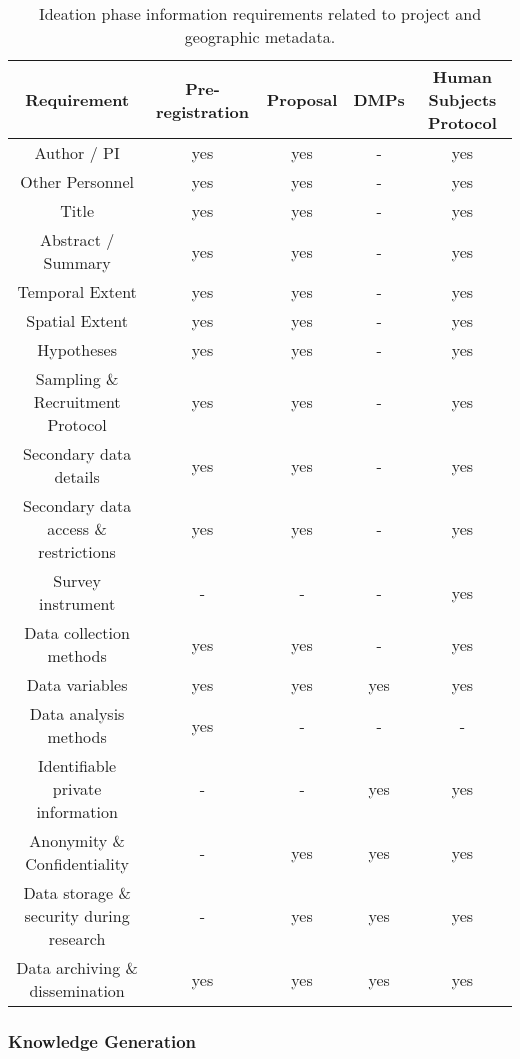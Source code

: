 \documentclass{isprs} %
\begin{document}
\begin{table*}[t]
	\centering
		\begin{tabular}{|c|c|c|c|c|}\hline
		   Requirement&Pre-registration&Proposal&DMPs&Human Subjects Protocol\\\hline
		     Author / PI                            & yes & yes & - & yes \\
		     Other Personnel                        & yes & yes & - & yes \\
    		 Title                                  & yes & yes & - & yes \\
    		 Abstract / Summary                     & yes & yes & - & yes \\
    		 Temporal Extent                        & yes & yes & - & yes \\
    		 Spatial Extent                         & yes & yes & - & yes \\
    		 Hypotheses                             & yes & yes & - & yes \\
    		 Sampling \& Recruitment Protocol        & yes & yes & - & yes \\
    		 Secondary data details                 & yes & yes & - & yes \\
    		 Secondary data access \& restrictions   & yes & yes & - & yes \\
    		 Survey instrument                      & - & - & - & yes \\
    		 Data collection methods                & yes & yes & - & yes \\
    		 Data variables                         & yes & yes & yes & yes \\
    		 Data analysis methods                  & yes & - & - & - \\
    		 Identifiable private information       & - & - & yes & yes \\
    		 Anonymity \& Confidentiality            & - & yes & yes & yes \\
    		 Data storage \& security during research& - & yes & yes & yes \\
    		 Data archiving \& dissemination         & yes & yes & yes & yes \\\hline
		\end{tabular}
	\caption{Ideation phase information requirements related to project and geographic metadata.}
\label{tab:Ideation_Info}
\end{table*}

\subsubsection{Knowledge Generation}
\end{document}
